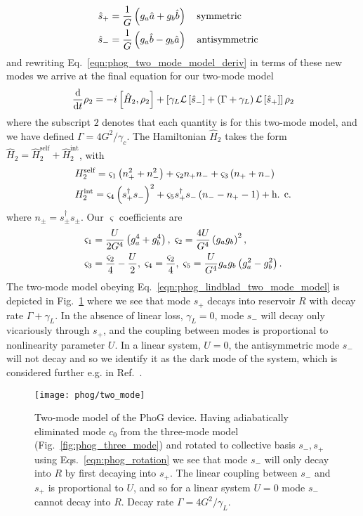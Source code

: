 \begin{align}\label{eqn:phog_rotation}
\hat{s}_+ &= \frac{1}{G} \left(g_a \hat{a} + g_b \hat{b}\right) \qq{symmetric}  \notag \\
%
\hat{s}_- &= \frac{1}{G} \left(g_a \hat{b} - g_b \hat{a}\right) \qq{antisymmetric}
\end{align}
and rewriting Eq.~\ref{eqn:phog_two_mode_model_deriv} in terms of these new modes we arrive at the final equation for our two-mode model
\begin{equation}\label{eqn:phog_lindblad_two_mode_model}
\frac{\mathrm{d}}{\mathrm{d}t} \rho_2 = - i \left[ \hat{H}_2, \rho_2 \right] + \left[ \gamma_L \mathcal{L}\left[\hat{s}_-\right] + \left(\Gamma + \gamma_L\right) \mathcal{L}\left[\hat{s}_+\right] \right] \rho_2
\end{equation}
where the subscript $2$ denotes that each quantity is for this two-mode model, and we have defined $\Gamma = 4 G^2 / \gamma_c$. The Hamiltonian $\hat{H}_2$ takes the form $\hat{H}_2 = \hat{H}_2^{\text{self}} + \hat{H}_2^{\text{int}}$, with
\begin{align}
&H_2^{\text{self}} = \varsigma_1\left(n_+^2 + n_-^2\right) + \varsigma_2 n_+ n_- + \varsigma_3\left(n_+ + n_-\right) \notag \\
%
&H_2^{\text{int}} = \varsigma_4 \left(s_+^\dagger s_-\right)^2 + \varsigma_5 s_+^\dagger s_- \left(n_- - n_+ - 1\right) + \hc
\end{align}
where $n_{\pm} = s_{\pm}^\dagger s_\pm$. Our $\varsigma$ coefficients are
\begin{align}
&\varsigma_1 = \frac{U}{2 G^4} \left(g_a^4 + g_b^4\right), \; \varsigma_2 = \frac{4 U}{G^4} \left(g_a g_b\right)^2, \notag \\
%
&\varsigma_3 = \frac{\varsigma_2}{4} - \frac{U}{2}, \; \varsigma_4 = \frac{\varsigma_2}{4}, \; \varsigma_5 = \frac{U}{G^4} g_a g_b \left(g_a^2 - g_b^2\right).
\end{align}
The two-mode model obeying Eq.~\ref{eqn:phog_lindblad_two_mode_model} is depicted in Fig.~\ref{fig:phog_two_mode_model} where we see that mode $s_+$ decays into reservoir $R$ with decay rate $\Gamma + \gamma_L$. In the absence of linear loss, $\gamma_L=0$, mode $s_-$ will decay only vicariously through $s_+$, and the coupling between modes is proportional to nonlinearity parameter $U$. In a linear system, $U = 0$, the antisymmetric mode $s_-$ will not decay and so we identify it as the dark mode of the system, which is considered further e.g. in Ref.~\cite{Delanty2012}.


\begin{figure}[htp]
\centering
\texttt{[image: phog/two\_mode]}
\caption{\label{fig:phog_two_mode_model} Two-mode model of the PhoG device. Having adiabatically eliminated mode $c_0$ from the three-mode model (Fig.~\ref{fig:phog_three_mode}) and rotated to collective basis $s_-, s_+$ using Eqs.~\ref{eqn:phog_rotation} we see that mode $s_-$ will only decay into $R$ by first decaying into $s_+$. The linear coupling between $s_-$ and $s_+$ is proportional to $U$, and so for a linear system $U=0$ mode $s_-$ cannot decay into $R$. Decay rate $\Gamma = 4 G^2 / \gamma_L$.}
\end{figure}


